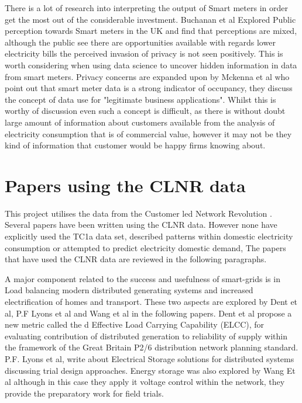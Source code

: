 There is a lot of research into interpreting the output of Smart meters in order get the most out of the considerable investment.
Buchanan et al \cite{buchanan2016} Explored Public perception towards Smart meters in the UK  and find that perceptions are mixed, although the public see there are opportunities available with regards lower electricity bills the perceived invasion of privacy is not seen positively. This is worth considering when using data science to uncover hidden information in data from smart meters. Privacy concerns are expanded upon by Mckenna et al  \cite{mckenna2012} who point out that smart meter data is a strong indicator of occupancy, they discuss the concept of data use for "legitimate business applications". Whilst this is worthy of discussion even such a concept is difficult, as there is without doubt large amount of information about customers available from the analysis of electricity consumption that is of commercial value, however it may not be they kind of information that customer would be happy firms knowing about. 


\section{Papers using the CLNR data}
This project utilises the data from the Customer led Network Revolution  \cite{customerlednetworkrevolution}. Several papers have been written using the CLNR data. However none have explicitly used the TC1a data set, described patterns within domestic electricity consumption or attempted to predict electricity domestic demand, The papers that have used the CLNR data are reviewed in the following paragraphs.

A major component related to the success and usefulness of smart-grids is in Load balancing modern distributed generating systems and increased electrification of homes and transport. These two aspects are explored by Dent et al, P.F Lyons et al and Wang et al in the following papers.
Dent et al \cite{dent2015} propose a new metric called the d Effective Load Carrying Capability (ELCC), for evaluating contribution of distributed generation to reliability of supply within the framework of the Great Britain P2/6 distribution network planning standard. 
P.F. Lyons et al, write about Electrical Storage solutions for distributed systems \cite{lyons2015} discussing trial design approaches. Energy storage was also explored by Wang Et al \cite{wang2014} although in this case they apply it voltage control within the network, they provide the preparatory work for field trials.

